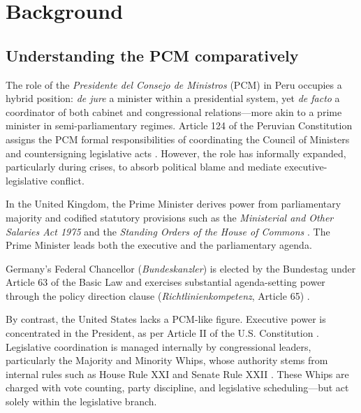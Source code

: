 \documentclass[a4paper, 12pt]{article}
\begin{document}
\section{Background}\label{backg-tables} %


\subsection{Understanding the PCM comparatively}

The role of the \textit{Presidente del Consejo de Ministros} (PCM) in Peru occupies a hybrid position: \textit{de jure} a minister within a presidential system, yet \textit{de facto} a coordinator of both cabinet and congressional relations—more akin to a prime minister in semi-parliamentary regimes. Article 124 of the Peruvian Constitution assigns the PCM formal responsibilities of coordinating the Council of Ministers and countersigning legislative acts \citep[art.124]{peru_constitucion_1993}. However, the role has informally expanded, particularly during crises, to absorb political blame and mediate executive-legislative conflict.

In the United Kingdom, the Prime Minister derives power from parliamentary majority and codified statutory provisions such as the \textit{Ministerial and Other Salaries Act 1975} \citep{united_kingdom_parliament_ministerial_1975} and the \textit{Standing Orders of the House of Commons} \citep{house_of_commons_standing_2024}. The Prime Minister leads both the executive and the parliamentary agenda.

Germany’s Federal Chancellor (\textit{Bundeskanzler}) is elected by the Bundestag under Article 63 of the Basic Law and exercises substantial agenda-setting power through the policy direction clause (\textit{Richtlinienkompetenz}, Article 65) \citep{federal_republic_of_germany_grundgesetz_1949}.

By contrast, the United States lacks a PCM-like figure. Executive power is concentrated in the President, as per Article II of the U.S. Constitution \citep{united_states_of_america_constitution_1787}. Legislative coordination is managed internally by congressional leaders, particularly the Majority and Minority Whips, whose authority stems from internal rules such as House Rule XXI and Senate Rule XXII \citep{us_house_of_representatives_rules_2023,us_senate_standing_2023}. These Whips are charged with vote counting, party discipline, and legislative scheduling—but act solely within the legislative branch.
\end{document}
